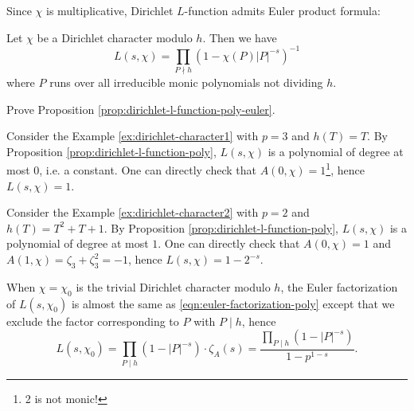 Since $\chi$ is multiplicative, Dirichlet $L$-function admits Euler product formula:
\begin{proposition}
    \label{prop:dirichlet-l-function-poly-euler}
    Let $\chi$ be a Dirichlet character modulo $h$.
    Then we have
    \begin{equation}
        L(s, \chi) = \prod_{P \nmid h} (1 - \chi(P) |P|^{-s})^{-1}
    \end{equation}
    where $P$ runs over all irreducible monic polynomials not dividing $h$.
\end{proposition}

\begin{exercise}
    Prove Proposition \ref{prop:dirichlet-l-function-poly-euler}.
\end{exercise}

\begin{example}
    \label{ex:dirichlet-l-function}
    Consider the Example \ref{ex:dirichlet-character1} with $p = 3$ and $h(T) = T$.
    By Proposition \ref{prop:dirichlet-l-function-poly}, $L(s, \chi)$ is a polynomial of degree at most $0$, i.e. a constant.
    One can directly check that $A(0, \chi) = 1$\footnote{2 is not monic!}, hence $L(s, \chi) = 1$.
\end{example}

\begin{example}
    Consider the Example \ref{ex:dirichlet-character2} with $p = 2$ and $h(T) = T^2 + T + 1$.
    By Proposition \ref{prop:dirichlet-l-function-poly}, $L(s, \chi)$ is a polynomial of degree at most $1$.
    One can directly check that $A(0, \chi) = 1$ and $A(1, \chi) = \zeta_3 + \zeta_3^2 = -1$, hence $L(s, \chi) = 1 - 2^{-s}$.
\end{example}

When $\chi = \chi_0$ is the trivial Dirichlet character modulo $h$, the Euler factorization of $L(s, \chi_0)$ is almost the same as \eqref{eqn:euler-factorization-poly} except that we exclude the factor corresponding to $P$ with $P \mid h$, hence
\begin{equation}
    L(s, \chi_0) = \prod_{P \mid h} (1 - |P|^{-s}) \cdot \zeta_A(s) = \frac{\prod_{P \mid h} (1 - |P|^{-s})}{1 - p^{1 - s}}.
    \label{eqn:dirichlet-l-function-chi0-euler}
\end{equation}

